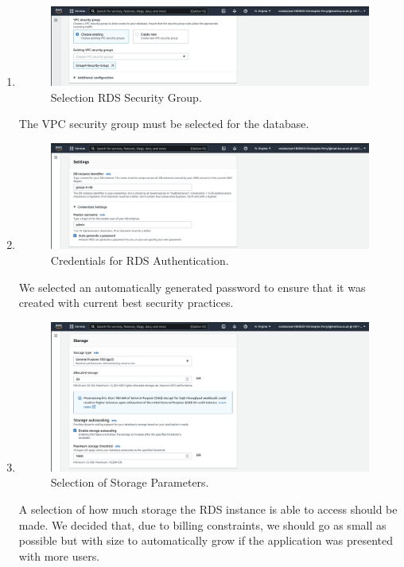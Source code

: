 \begin{enumerate}
    \item
    \begin{figure}[H]
        \centering
        \includegraphics[width=\textwidth]{resources/rds/rds-security-group}
        \caption{Selection RDS Security Group.}
        \label{fig:rds-security}
    \end{figure}\nolinebreak
    The VPC security group must be selected for the database.

    \item
    \begin{figure}[H]
        \centering
        \includegraphics[width=\textwidth]{resources/rds/rds-settings}
        \caption{Credentials for RDS Authentication.}
        \label{fig:rds-settings}
    \end{figure}\nolinebreak
    We selected an automatically generated password to ensure that it was created with current best security practices.

    \item
    \begin{figure}[H]
        \centering
        \includegraphics[width=\textwidth]{resources/rds/rds-storage}
        \caption{Selection of Storage Parameters.}
        \label{fig:rds-storage}
    \end{figure}\nolinebreak
    A selection of how much storage the RDS instance is able to access should be made.
    We decided that, due to billing constraints, we should go as small as possible but with size to automatically grow if
    the application was presented with more users.


\end{enumerate}
